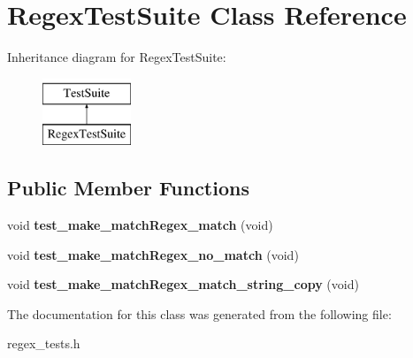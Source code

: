 \hypertarget{classRegexTestSuite}{\section{Regex\-Test\-Suite Class Reference}
\label{classRegexTestSuite}
}
Inheritance diagram for Regex\-Test\-Suite\-:\begin{figure}[H]
\begin{center}
\leavevmode
\includegraphics[height=2.000000cm]{classRegexTestSuite}
\end{center}
\end{figure}
\subsection*{Public Member Functions}
\begin{DoxyCompactItemize}
\item 
\hypertarget{classRegexTestSuite_aac0838d917fd9fd6cc71ee086c644555}{void {\bfseries test\-\_\-make\-\_\-match\-Regex\-\_\-match} (void)}\label{classRegexTestSuite_aac0838d917fd9fd6cc71ee086c644555}

\item 
\hypertarget{classRegexTestSuite_ad9c02b9f4fd7feca750d476cda8e0c60}{void {\bfseries test\-\_\-make\-\_\-match\-Regex\-\_\-no\-\_\-match} (void)}\label{classRegexTestSuite_ad9c02b9f4fd7feca750d476cda8e0c60}

\item 
\hypertarget{classRegexTestSuite_a0f46b90e2c0a1c98750a3335d086979a}{void {\bfseries test\-\_\-make\-\_\-match\-Regex\-\_\-match\-\_\-string\-\_\-copy} (void)}\label{classRegexTestSuite_a0f46b90e2c0a1c98750a3335d086979a}

\end{DoxyCompactItemize}


The documentation for this class was generated from the following file\-:\begin{DoxyCompactItemize}
\item 
regex\-\_\-tests.\-h\end{DoxyCompactItemize}
